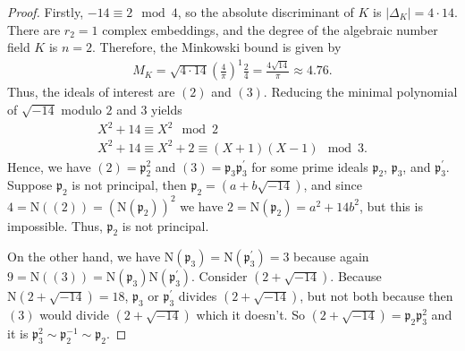 \begin{proof}
    Firstly, \(-14 \equiv 2 \mod{4}\), so the absolute discriminant of \(K\) is \(|\Delta_K| = 4 \cdot 14\). There are \(r_2 = 1\) complex embeddings, and the degree of the algebraic number field \(K\) is \(n = 2\). Therefore, the Minkowski bound is given by
    \begin{align*}
        M_K = \sqrt{4 \cdot 14} \left(\frac{4}{\pi}\right)^1 \frac{2}{4}
        = \frac{4\sqrt{14}}{\pi}
        \approx 4.76 \text{.}
    \end{align*}
    Thus, the ideals of interest are \((2)\) and \((3)\). Reducing the minimal polynomial of \(\sqrt{-14}\) modulo \(2\) and \(3\) yields
    \begin{align*}
        X^2 + 14 \equiv X^2 \mod{2} \\
        X^2 + 14 \equiv X^2 + 2 \equiv (X + 1)(X - 1) \mod{3} \text{.}
    \end{align*}
    Hence, we have \((2) = \mathfrak{p}_2^2\) and \((3) = \mathfrak{p}_3 \mathfrak{p}_3^\prime\) for some prime ideals \(\mathfrak{p}_2\), \(\mathfrak{p}_3\), and \(\mathfrak{p}_3^\prime\). Suppose \(\mathfrak{p}_2\) is not principal, then \(\mathfrak{p}_2 = (a + b \sqrt{-14})\), and since \(4 = \mathrm{N}((2)) = (\mathrm{N}(\mathfrak{p}_2))^2\) we have \(2 = \mathrm{N}(\mathfrak{p}_2) = a^2 + 14b^2\), but this is impossible. Thus, \(\mathfrak{p}_2\) is not principal.

    On the other hand, we have \(\mathrm{N}(\mathfrak{p}_3) = \mathrm{N}(\mathfrak{p}_3^\prime) = 3\) because again \(9 = \mathrm{N}((3)) = \mathrm{N}(\mathfrak{p}_3)\mathrm{N}(\mathfrak{p}_3^\prime)\). Consider \((2 + \sqrt{-14})\). Because \(\mathrm{N}(2 + \sqrt{-14}) = 18\), \(\mathfrak{p}_3\) or \(\mathfrak{p}_3^\prime\) divides \((2 + \sqrt{-14})\), but not both because then \((3)\) would divide \((2 + \sqrt{-14})\) which it doesn't. So \((2 + \sqrt{-14}) = \mathfrak{p}_2 \mathfrak{p}_3^2\) and it is \(\mathfrak{p}_3^2 \sim \mathfrak{p}_2^{-1} \sim \mathfrak{p}_2\).
\end{proof}


